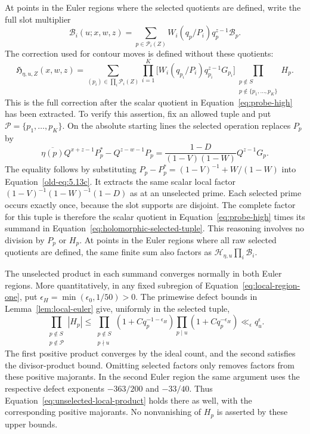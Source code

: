 \documentclass[11pt,a4paper]{article}
\numberwithin{equation}{section}
\numberwithin{figure}{section}
\theoremstyle{definition}
\theoremstyle{remark}
\begin{document}
At points in the Euler regions where the selected quotients are defined,
write the full slot
multiplier
\[
 \mathcal B_i(u;x,w,z)=\sum_{p\in\mathcal P_i(Z)}
           W_i(q_p/P_i)q_p^{z-1}\mathcal B_p.
\]
The correction used for contour moves is defined without these quotients:
\begin{equation}\label{eq:holomorphic-selected-tuple}
 \mathfrak H_{\eta,u,Z}(x,w,z)=
 \sum_{(p_i)\in\prod_i\mathcal P_i(Z)}
 \prod_{i=1}^K\bigl[W_i(q_{p_i}/P_i)q_{p_i}^{z-1}G_{p_i}\bigr]
 \prod_{\substack{p\notin S\\p\notin\{p_1,\ldots,p_K\}}}H_p.
\end{equation}
This is the full correction after the scalar quotient in
Equation~\eqref{eq:probe-high} has been extracted.  To verify this assertion,
fix an allowed tuple and put $\mathcal P=\{p_1,\ldots,p_K\}$.  On the
absolute starting lines the selected operation replaces $P_p$ by
\begin{equation}\label{eq:selected-local-operation}
 \overline{\eta(p)}Q^{x+z-1}P_p^*-Q^{z-w-1}P_p
 =\frac{1-D}{(1-V)(1-W)}Q^{z-1}G_p.
\end{equation}
The equality follows by substituting
$P_p-P_p^*=(1-V)^{-1}+W/(1-W)$ into
Equation~\eqref{old-eq:5.13c}.  It extracts the same scalar local factor
$(1-V)^{-1}(1-W)^{-1}(1-D)$ as at an unselected prime.  Each selected
prime occurs exactly once, because the slot
supports are disjoint.  The complete factor for this tuple is therefore
the scalar quotient in Equation~\eqref{eq:probe-high} times its summand in
Equation~\eqref{eq:holomorphic-selected-tuple}.  This reasoning involves
no division by $P_p$ or $H_p$.  At points in the Euler regions where all
raw selected quotients are defined, the same finite sum also factors as
$\mathcal H_{\eta,u}\prod_i\mathcal B_i$.

The unselected product in each summand converges normally in both Euler
regions.  More quantitatively, in any fixed subregion of
Equation~\eqref{eq:local-region-one}, put
$\epsilon_H=\min(\epsilon_0,1/50)>0$.  The primewise defect bounds in
Lemma~\ref{lem:local-euler} give, uniformly in the selected tuple,
\begin{equation}\label{eq:unselected-local-product}
 \prod_{\substack{p\notin S\\p\notin\mathcal P}}|H_p|
 \le
 \prod_{\substack{p\notin S\\p\nmid u}}
       (1+Cq_p^{-1-\epsilon_H})
 \prod_{p\mid u}(1+Cq_p^{-\epsilon_H})
 \ll_\epsilon q_u^\epsilon.
\end{equation}
The first positive product converges by the ideal count, and the second
satisfies the divisor-product bound.  Omitting selected factors only removes
factors from these positive majorants.  In the second Euler region the same
argument uses the respective defect exponents $-363/200$ and $-33/40$.
Thus Equation~\eqref{eq:unselected-local-product} holds there as well,
with the corresponding positive majorants.  No nonvanishing of $H_p$ is
asserted by these upper bounds.
\end{document}
